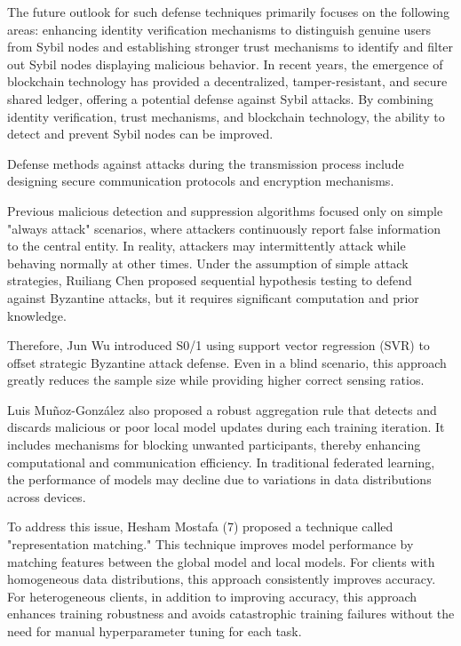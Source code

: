 \documentclass[conference]{IEEEtran}
\begin{document}
The future outlook for such defense techniques primarily focuses on the following areas:
enhancing identity verification mechanisms to distinguish genuine users from Sybil nodes 
and establishing stronger trust mechanisms to identify and filter out Sybil nodes displaying
malicious behavior. In recent years, the emergence of blockchain technology has provided a 
decentralized, tamper-resistant, and secure shared ledger, offering a potential defense against 
Sybil attacks. By combining identity verification, trust mechanisms, and blockchain technology, 
the ability to detect and prevent Sybil nodes can be improved.


Defense methods against attacks during the transmission process include designing secure communication protocols and encryption mechanisms.

Previous malicious detection and suppression algorithms focused only on simple "always attack" 
scenarios, where attackers continuously report false information to the central entity. 
In reality, attackers may intermittently attack while behaving normally at other times. 
Under the assumption of simple attack strategies, Ruiliang Chen \cite{b129} proposed sequential hypothesis
testing to defend against Byzantine attacks, but it requires significant computation and prior 
knowledge. 

Therefore, Jun Wu \cite{b119} introduced S0/1 using support vector regression (SVR) to offset 
strategic Byzantine attack defense. Even in a blind scenario, this approach greatly reduces the 
sample size while providing higher correct sensing ratios.


Luis Muñoz-González \cite{b127} also proposed a robust aggregation rule that detects and discards malicious or poor local model updates during each training iteration. It includes mechanisms for blocking unwanted participants, thereby enhancing computational and communication efficiency.
In traditional federated learning, the performance of models may decline due to variations in data distributions across devices. 

To address this issue, Hesham Mostafa (7) proposed a technique called "representation matching." 
This technique improves model performance by matching features between the global model and 
local models. For clients with homogeneous data distributions, this approach consistently 
improves accuracy. For heterogeneous clients, in addition to improving accuracy, this approach 
enhances training robustness and avoids catastrophic training failures without the need for manual 
hyperparameter tuning for each task.
\end{document}
